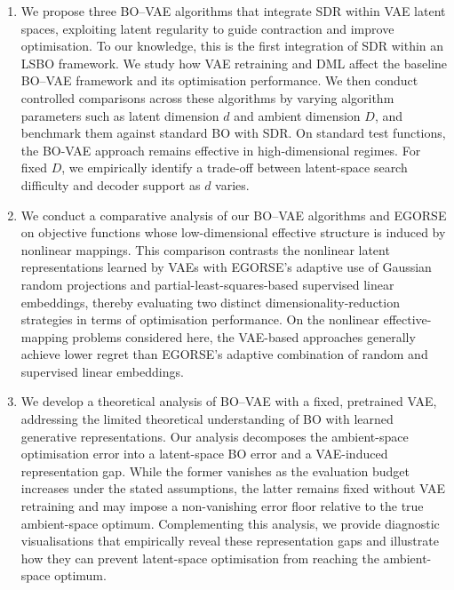 \documentclass[pdflatex,sn-mathphys-num]{sn-jnl}%
\theoremstyle{thmstyleone}%
\theoremstyle{thmstyletwo}%
\theoremstyle{thmstylethree}%
\begin{document}
\begin{enumerate}
    \item We propose three BO–VAE algorithms that integrate SDR within VAE latent spaces, exploiting latent regularity to guide contraction and improve optimisation. To our knowledge, this is the first integration of SDR within an LSBO framework. We study how VAE retraining \cite{Tripp2020} and DML \cite{grosnit2021highdimensionalbayesianoptimisationvariational} affect the baseline BO–VAE framework and its optimisation performance. We then conduct controlled comparisons across these algorithms by varying algorithm parameters such as latent dimension $d$ and ambient dimension $D$, and benchmark them against standard BO with SDR. On standard test functions, the BO-VAE approach remains effective in high-dimensional regimes. For fixed $D$, we empirically identify a trade-off between latent-space search difficulty and decoder support as $d$ varies.\\

    \item We conduct a comparative analysis of our BO--VAE algorithms and EGORSE \cite{egorse} on objective functions whose low-dimensional effective structure is induced by nonlinear mappings. This comparison contrasts the nonlinear latent representations learned by VAEs with EGORSE's adaptive use of Gaussian random projections and partial-least-squares-based supervised linear embeddings, thereby evaluating two distinct dimensionality-reduction strategies in terms of optimisation performance. On the nonlinear effective-mapping problems considered here, the VAE-based approaches generally achieve lower regret than EGORSE's adaptive combination of random and supervised linear embeddings.\\
    
    \item We develop a theoretical analysis of BO--VAE with a fixed, pretrained VAE, addressing the limited theoretical understanding of BO with learned generative representations. Our analysis decomposes the ambient-space optimisation error into a latent-space BO error and a VAE-induced representation gap. While the former vanishes as the evaluation budget increases under the stated assumptions, the latter remains fixed without VAE retraining and may impose a non-vanishing error floor relative to the true ambient-space optimum. Complementing this analysis, we provide diagnostic visualisations that empirically reveal these representation gaps and illustrate how they can prevent latent-space optimisation from reaching the ambient-space optimum.

\end{enumerate}
\end{document}
